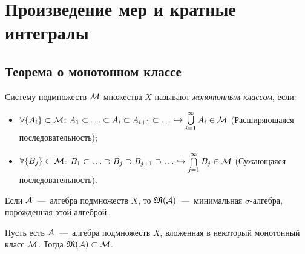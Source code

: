 \section{Произведение мер и кратные интегралы}
\subsection{Теорема о монотонном классе}
\begin{definition}
    Систему подмножеств $\mathcal{M}$ множества $X$ называют \textit{монотонным классом}, если:
    \begin{itemize}
        \item $\forall \{A_i\} \subset \mathcal{M}$: $A_1 \subset \ldots \subset A_i \subset A_{i + 1} \subset \ldots \hookrightarrow \bigcup\limits_{i = 1}^\infty A_i \in \mathcal{M}$ (Расширяющаяся последовательность);
        \item $\forall \{B_j\} \subset \mathcal{M}$: $B_1 \subset \ldots \supset B_j \supset B_{j + 1} \supset \ldots \hookrightarrow \bigcap\limits_{j = 1}^\infty B_j \in \mathcal{M}$ (Сужающаяся последовательность).
    \end{itemize}
\end{definition}
\begin{reminder}
    Если $\mathcal{A}$~---~алгебра подмножеств $X$, то $\mathfrak{M}(\mathcal{A})$~---~минимальная $\sigma$-алгебра, порожденная этой алгеброй.
\end{reminder}
\begin{theorem}
    Пусть есть $\mathcal{A}$~---~алгебра подмножеств $X$, вложенная в некоторый монотонный класс $\mathcal{M}$. Тогда $\mathfrak{M}(\mathcal{A}) \subset \mathcal{M}$.
\end{theorem}
